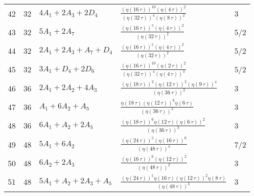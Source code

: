 \begin{longtable}{|l|l|l|l|l|}
  42 & 32 & $4 A_{1} + 2 A_{3} + 2 D_{4}$ & ${\frac { \left( \eta \left( 16\,\tau \right)  \right) ^{10} \left( \eta \left( 4\,\tau \right)  \right) ^{2}}{ \left( \eta \left( 32\,\tau \right)  \right) ^{4} \mbox{} \left( \eta \left( 8\,\tau \right)  \right) ^{2}}}$ & 3 \\ 
  43 & 32 & $5 A_{1} + 2 A_{7}$ & ${\frac { \left( \eta \left( 16\,\tau \right)  \right) ^{5} \left( \eta \left( 4\,\tau \right)  \right) ^{2}}{ \left( \eta \left( 32\,\tau \right)  \right) ^{2}}}$ & 5/2 \\ 
  44 & 32 & $2 A_{1} + 2 A_{3} +  A_{7} +  D_{4}$ & ${\frac { \left( \eta \left( 16\,\tau \right)  \right) ^{5} \left( \eta \left( 4\,\tau \right)  \right) ^{2}}{ \left( \eta \left( 32\,\tau \right)  \right) ^{2}}}$ & 5/2 \\ 
  45 & 32 & $3 A_{1} +  D_{4} + 2 D_{6}$ & ${\frac { \left( \eta \left( 16\,\tau \right)  \right) ^{10} \left( \eta \left( 2\,\tau \right)  \right) ^{2}}{ \left( \eta \left( 32\,\tau \right)  \right) ^{4} \mbox{} \left( \eta \left( 4\,\tau \right)  \right) ^{3}}}$ & 5/2 \\ 
  46 & 36 & $2 A_{1} + 2 A_{2} + 4 A_{3}$ & ${\frac { \left( \eta \left( 18\,\tau \right)  \right) ^{2} \left( \eta \left( 12\,\tau \right)  \right) ^{2} \left( \eta \left( 9\,\tau \right)  \right) ^{4} \mbox{}}{ \left( \eta \left( 36\,\tau \right)  \right) ^{2}}}$ & 3 \\ 
  47 & 36 & $ A_{1} + 6 A_{2} +  A_{5}$ & ${\frac {\eta \left( 18\,\tau \right)  \left( \eta \left( 12\,\tau \right)  \right) ^{6}\eta \left( 6\,\tau \right) }{ \left( \eta \left( 36 \mbox{}\,\tau \right)  \right) ^{2}}}$ & 3 \\ 
  48 & 36 & $6 A_{1} +  A_{2} + 2 A_{5}$ & ${\frac { \left( \eta \left( 18\,\tau \right)  \right) ^{6}\eta \left( 12\,\tau \right)  \left( \eta \left( 6\,\tau \right)  \right) ^{2}}{ \left( \eta \left( 36 \mbox{}\,\tau \right)  \right) ^{3}}}$ & 3 \\ 
  49 & 48 & $5 A_{1} + 6 A_{2}$ & ${\frac { \left( \eta \left( 24\,\tau \right)  \right) ^{5} \left( \eta \left( 16\,\tau \right)  \right) ^{6}}{ \left( \eta \left( 48\,\tau \right)  \right) ^{4}}}$ & 7/2 \\ 
  50 & 48 & $6 A_{2} + 2 A_{3}$ & ${\frac { \left( \eta \left( 16\,\tau \right)  \right) ^{6} \left( \eta \left( 12\,\tau \right)  \right) ^{2}}{ \left( \eta \left( 48\,\tau \right)  \right) ^{2}}}$ & 3 \\ 
  51 & 48 & $5 A_{1} +  A_{2} + 2 A_{3} +  A_{5}$ & ${\frac { \left( \eta \left( 24\,\tau \right)  \right) ^{5}\eta \left( 16\,\tau \right)  \left( \eta \left( 12\,\tau \right)  \right) ^{2} \mbox{}\eta \left( 8\,\tau \right) }{ \left( \eta \left( 48\,\tau \right)  \right) ^{3}}}$ & 3 \\ 

\end{longtable}
